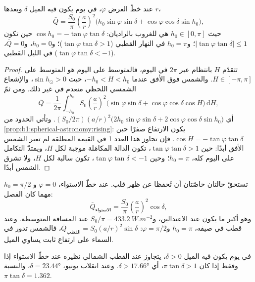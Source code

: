 \begin{theorem}\label{thm:b1:radiation-heat-transport:daily}
عند خطّ العرض $\varphi$، في يوم يكون فيه  الميل $\delta$ وبعدها $r$،
\[
  \bar Q = \frac{S_0}{\pi}\left(\frac{a}{r}\right)^{2}
  \bigl(h_0\sin\varphi\sin\delta + \cos\varphi\cos\delta\sin h_0\bigr),
\]
حيث $h_0 \in [0, \pi]$ هي  للغروب بالراديان: $\cos h_0 =
-\tan\varphi\tan\delta$ حين تكون $|\tan\varphi\tan\delta| \le 1$؛ و$h_0 = \pi$ في النهار القطبي ($\tan\varphi\tan\delta > 1$)؛ و$h_0 = 0$، و$\bar Q = 0$، في الليل القطبي
($\tan\varphi\tan\delta < -1$).
\end{theorem}

\begin{proof}
تتقدّم  $H$ بانتظام عبر $2\pi$ في اليوم، فالمتوسط على اليوم هو المتوسط على $H \in [-\pi, \pi]$. والشمس فوق الأفق عندما $-h_0 < H < h_0$، حيث $\sin h_\odot > 0$، والإشعاع الشمسي اللحظي منعدم في غير ذلك. ومن ثمّ
\[
  \bar Q = \frac{1}{2\pi}\int_{-h_0}^{h_0} S_0\left(\frac{a}{r}\right)^{2}
  \bigl(\sin\varphi\sin\delta + \cos\varphi\cos\delta\cos H\bigr)\,\mathrm dH ,
\]
أي $(S_0/2\pi)(a/r)^2\bigl(2h_0\sin\varphi\sin\delta +
2\cos\varphi\cos\delta\sin h_0\bigr)$.
وتأتي الحدود من \cref{prop:b1:spherical-astronomy:rising}: يكون الارتفاع صفرًا حين $\cos H = -\tan\varphi\tan\delta$. فإن تجاوز هذا العدد 1 في القيمة المطلقة لم تعبر الشمس الأفق أبدًا: حين $\tan\varphi\tan\delta > 1$، تكون الدالة المكامَلة موجبة لكل $H$، ويمتدّ التكامل على اليوم كله، $h_0 = \pi$؛ وحين $\tan\varphi\tan\delta < -1$، تكون سالبة لكل $H$، ولا تشرق الشمس أبدًا.
\end{proof}

تستحقّ حالتان خاصّتان أن تُحفظا عن ظهر قلب. عند خطّ الاستواء، $\varphi = 0$ و
$h_0 = \pi/2$ مهما كان الفصل:
\[
  \bar Q_\text{الاستواء} = \frac{S_0}{\pi}\left(\frac{a}{r}\right)^{2}\cos\delta ,
\]
وهو أكبر ما يكون عند الاعتدالين، و$S_0/\pi = \qty{433.2}{W.m^{-2}}$ عند المسافة المتوسطة. وعند قطب في صيفه، $h_0 = \pi$ و$\varphi = \pi/2$: $\bar Q_\text{القطب} =
S_0(a/r)^2\sin\delta$، فالشمس تدور في السماء على ارتفاع ثابت يساوي الميل.

\begin{proposition}\label{prop:b1:radiation-heat-transport:polar-summer}
في يوم يكون فيه الميل $\delta > 0$، يتجاوز  عند القطب الشمالي نظيره عند خطّ الاستواء إذا وفقط إذا كان $\pi\tan\delta > 1$، أي $\delta >
\ang{17.66}$. وعند انقلاب يونيو، $\delta = \ang{23.44}$، والنسبة $\pi\tan
\delta = 1.362$.
\end{proposition}


